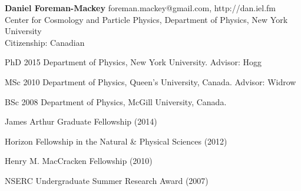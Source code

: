 \documentclass[12pt,letterpaper]{article}
\begin{document}
\thispagestyle{empty}\sloppy\sloppypar\raggedbottom

\textbf{\Large Daniel Foreman-Mackey} \hfill
\textsf{\small foreman.mackey@gmail.com, http://dan.iel.fm} \\[0.5ex]
Center for Cosmology and Particle Physics, Department of Physics, New York
University \\
Citizenship: Canadian\\[0.5ex]

\begin{list}{}{\cvlist}
\item
PhD 2015 Department of Physics, New York University. Advisor: Hogg
\item
MSc 2010 Department of Physics, Queen's University, Canada. Advisor: Widrow
\item
BSc 2008 Department of Physics, McGill University, Canada.
\end{list}

\begin{list}{}{\cvlist}

\item James Arthur Graduate Fellowship (2014)
\item Horizon Fellowship in the Natural \& Physical Sciences (2012)
\item Henry M. MacCracken Fellowship (2010)
\item NSERC Undergraduate Summer Research Award (2007)

\end{list}

\ifdefined\withpubs
    \begin{list}{}{\cvlist}
    
    \end{list}

    \begin{list}{}{\cvlist}
    
    \end{list}
\fi
\end{document}
